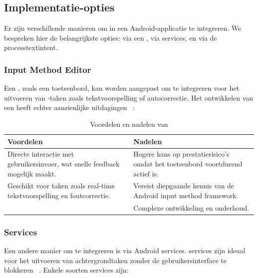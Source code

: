\subsection{Implementatie-opties}

Er zijn verschillende manieren om  in een Android-applicatie te integreren. We bespreken hier de belangrijkste opties: via een , via \gls{services}, en via de \gls{processtextintent}.

\subsubsection{Input Method Editor}

Een , zoals een toetsenbord, kan worden aangepast om  te integreren voor het uitvoeren van -taken zoals tekstvoorspelling of autocorrectie. Het ontwikkelen van een  heeft echter aanzienlijke uitdagingen ~\autocite{Android2024IME}:

\begin{table} [H]
    \centering
    \begin{tabular}{p{} p{}}
        \toprule
        \textbf{Voordelen} & \textbf{Nadelen} \\
        \midrule
        Directe interactie met gebruikersinvoer, wat snelle feedback mogelijk maakt. &  Hogere kans op prestatierisico's omdat het toetsenbord voortdurend actief is. \\
        Geschikt voor taken zoals real-time tekstvoorspelling en foutcorrectie. & Vereist diepgaande kennis van de Android input method framework. \\
        &  Complexe ontwikkeling en onderhoud.\\
        \bottomrule
    \end{tabular}
    \caption[Voordelen en nadelen van ]{\label{tab:ime_pros_cons}Voordelen en nadelen van }
\end{table}

\subsubsection{Services}

Een andere manier om  te integreren is via Android \gls{services}. \Gls{services} zijn ideaal voor het uitvoeren van achtergrondtaken zonder de gebruikersinterface te blokkeren  ~\autocite{Android2024Services}. Enkele soorten \gls{services} zijn:

